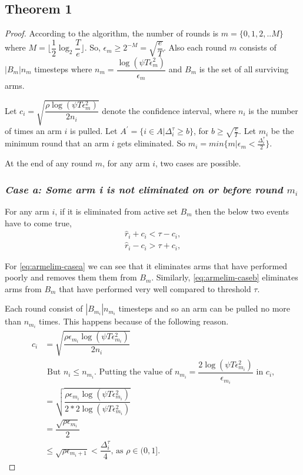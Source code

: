 \subsection{Theorem 1}

\begin{proof}

According to the algorithm, the number of rounds is $m=\lbrace 0,1,2,.. M\rbrace $ where $M=\big\lfloor \dfrac{1}{2}\log_{2} \dfrac{T}{e}\big\rfloor$. So, $\epsilon_{m}\geq 2^{-M} = \sqrt{\dfrac{e}{T}}$. Also each round $m$ consists of $|B_{m}|n_{m}$ timesteps where $n_{m} = \dfrac{\log(\psi T \epsilon_{m}^{2})}{\epsilon_{m}}$ and $B_{m}$ is the set of all surviving arms. 

Let $c_{i} = \sqrt{\dfrac{\rho\log{(\psi T\epsilon_{m}^{2})}}{2 n_{i}}}$ denote the confidence interval, where $n_{i}$ is the number of times an arm $i$ is pulled. Let $A^{'}=\lbrace i\in A|\Delta_{i}^{\tau}\geq b\rbrace$, for $b\geq \sqrt{\frac{e}{T}}$. Let $m_{i}$ be the minimum round that an arm $i$ gets eliminated. So $m_{i}=min\lbrace m| \epsilon_{m}<\frac{\Delta_{i}^{\tau}}{2}\rbrace$. 

At the end of any round $m$, for any arm $i$, two cases are possible.

\subsubsection{\textit{Case a: Some arm i is not eliminated on or before round $m_{i}$}}
For any arm $i$, if it is eliminated from active set $B_{m}$ then the below two events have to come true,
\begin{align}
\hat{r}_{i} + c_{i} < \tau - c_{i}, \label{eq:armelim-casea}\\
\hat{r}_{i} - c_{i} > \tau + c_{i}, \label{eq:armelim-caseb}
\end{align}

For \ref{eq:armelim-casea} we can see that it eliminates arms that have performed poorly and removes them them from $B_{m}$. Similarly, \ref{eq:armelim-caseb} eliminates arms from $B_{m}$ that have performed very well compared to threshold $\tau$.

Each round consist of $|B_{m_{i}}|n_{m_{i}}$ timesteps and so an arm can be pulled no more than $n_{m_{i}}$ times. This happens because of the following reason. 
\begin{align*}
c_{i}&=\sqrt{\dfrac{\rho\epsilon_{m_{i}}\log (\psi T\epsilon_{m_{i}}^{2})}{2 n_{i}}}\\
&\text{ But $n_{i}\leq n_{m_{i}}$. Putting the value of $n_{m_{i}}=\dfrac{2\log{(\psi T\epsilon_{m_{i}}^{2})}}{\epsilon_{m_{i}}}$ in $c_{i}$,}\\
&=\sqrt{\dfrac{\rho\epsilon_{m_{i}}\log (\psi T\epsilon_{m_{i}}^{2})}{2*2 \log(\psi T\epsilon_{m_{i}}^{2})}}\\
& =\dfrac{\sqrt{\rho\epsilon_{m_{i}}}}{2}\\
& \leq \sqrt{\rho\epsilon_{m_{i}+1}} < \dfrac{\Delta_{i}^{\tau}}{4} \text{, as }\rho\in (0,1].
\end{align*}


\end{proof}
